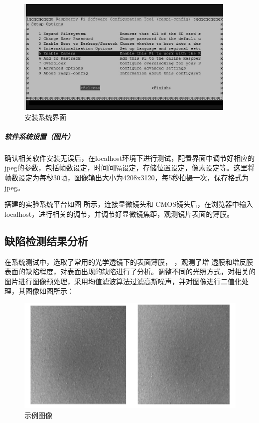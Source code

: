 \begin{figure}[h]
\centering
\includegraphics[width=0.7\linewidth]{Figure/rasp_4}
\caption{安装系统界面}
\label{fig:rasp_4}
\end{figure}

\subparagraph{软件系统设置（图片）}
确认相关软件安装无误后，在localhost环境下进行测试，配置界面中调节好相应的jpeg的参数，包括帧数设定，时间间隔设定，存储位置设定，像素设定等。这里将帧数设定为每秒30帧，图像输出大小为4208x3120，每5秒拍摄一次，保存格式为jpeg。

搭建的实验系统平台如图 所示，连接显微镜头和 CMOS镜头后，在浏览器中输入localhost，进行相关的调节，并调节好显微镜焦距，观测镜片表面的薄膜。

\subsection{缺陷检测结果分析}

在系统测试中，选取了常用的光学透镜下的表面薄膜， ，观测了增 透膜和增反膜表面的缺陷程度，对表面出现的缺陷进行了分析。调整不同的光照方式，对相关的图片进行图像预处理，采用均值滤波算法过滤高斯噪声，并对图像进行二值化处理，其图像如图所示：
\begin{figure}[h]
\centering
\includegraphics[width=0.7\linewidth]{Figure/ex_1}
\caption{示例图像}
\label{fig:ex_1}
\end{figure}

